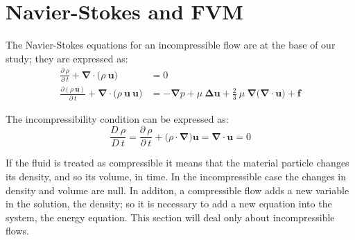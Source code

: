 \newpage
\section{Navier-Stokes and FVM}

    \setcounter{page}{1}
    \renewcommand{\thepage}{B-\arabic{page}}
    
The Navier-Stokes equations for an incompressible flow are at the base of our study; they are expressed as:
\begin{align}
        \frac{\partial \ \rho}{\partial \ t} + \boldsymbol{\nabla} \cdot \big( \rho \ \boldsymbol{u} \big) & = 0 \\
        \frac{\partial(\rho \ \boldsymbol{u})}{\partial \  t} + \boldsymbol{\nabla} \cdot \big( \rho \ \boldsymbol{u} \ \boldsymbol{u} \big) & = - \boldsymbol{\nabla} p + \mu \ \boldsymbol{\Delta} \boldsymbol{u} + \frac{2}{3} \ \mu \ \boldsymbol{\nabla} \big( \boldsymbol{\nabla} \cdot \boldsymbol{u} \big)  + \boldsymbol{f}
        \label{eqn:NS}
\end{align}

\noindent The incompressibility condition can be expressed as:
\begin{equation}
    \frac{D \ \rho}{D \ t} = \frac{\partial \ \rho}{\partial \ t} + \big( \rho \cdot \boldsymbol{\nabla} \big) \boldsymbol{u} = \boldsymbol{\nabla} \cdot \boldsymbol{u} = 0
\label{eqn:INC}
\end{equation}

\noindent If the fluid is treated as compressible it means that the material particle changes its density, and so its volume, in time. In the incompressible case the changes in density and volume are null. In additon, a compressible flow adds a new variable in the solution, the density; so it is necessary to add a new equation into the system, the energy equation. This section will deal only about incompressible flows.   

